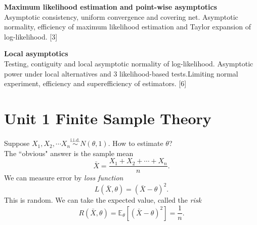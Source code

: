 \documentclass[a4paper]{article}
\begin{document}
{	\vspace{10pt}
	\noindent\textbf{Maximum likelihood estimation and point-wise asymptotics}\\
	Asymptotic consistency, uniform convergence and covering net. Asymptotic normality, efficiency of maximum likelihood estimation and Taylor expansion of log-likelihood.\hspace*{\fill} [3]
	
	\vspace{10pt}
	\noindent\textbf{Local asymptotics}\\
	Testing, contiguity and local asymptotic normality of log-likelihood. Asymptotic power under local alternatives and 3 likelihood-based tests.Limiting normal experiment, efficiency and superefficiency of estimators.\hspace*{\fill} [6]}

\tableofcontents

\setcounter{section}{0}

\section*{Unit 1 Finite Sample Theory}

\begin{eg*}
	Suppose $X_1,X_2,\cdots X_n \stackrel{\text{i.i.d.}}{\sim} N(\theta,1)$. How to estimate $\theta$? \\
	The ``obvious" answer is the sample mean
	\begin{equation*}
		\bar{X} = \frac{X_1+X_2+\cdots+X_n}{n}.
	\end{equation*}
	We can measure error by \emph{loss function}
	\begin{equation*}
		L(\bar{X},\theta) = (\bar{X} - \theta)^2.
	\end{equation*}
	This is random. We can take the expected value, called the \emph{risk}
	\begin{equation*}
		R(\bar{X},\theta) = \mathbb{E}_{\theta}\left[(\bar{X}-\theta)^2\right] = \frac{1}{n}.
	\end{equation*}
\end{eg*}
\end{document}
